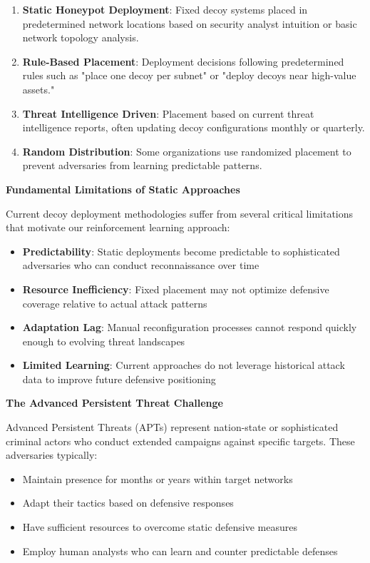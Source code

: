 \documentclass[12pt,oneside]{article}
\begin{document}
\begin{enumerate}
    \item \textbf{Static Honeypot Deployment}: Fixed decoy systems placed in predetermined network locations based on security analyst intuition or basic network topology analysis.
    
    \item \textbf{Rule-Based Placement}: Deployment decisions following predetermined rules such as "place one decoy per subnet" or "deploy decoys near high-value assets."
    
    \item \textbf{Threat Intelligence Driven}: Placement based on current threat intelligence reports, often updating decoy configurations monthly or quarterly.
    
    \item \textbf{Random Distribution}: Some organizations use randomized placement to prevent adversaries from learning predictable patterns.
\end{enumerate}

\textbf{Fundamental Limitations of Static Approaches}

Current decoy deployment methodologies suffer from several critical limitations that motivate our reinforcement learning approach:

\begin{itemize}
    \item \textbf{Predictability}: Static deployments become predictable to sophisticated adversaries who can conduct reconnaissance over time
    \item \textbf{Resource Inefficiency}: Fixed placement may not optimize defensive coverage relative to actual attack patterns
    \item \textbf{Adaptation Lag}: Manual reconfiguration processes cannot respond quickly enough to evolving threat landscapes
    \item \textbf{Limited Learning}: Current approaches do not leverage historical attack data to improve future defensive positioning
\end{itemize}

\textbf{The Advanced Persistent Threat Challenge}

Advanced Persistent Threats (APTs) represent nation-state or sophisticated criminal actors who conduct extended campaigns against specific targets. These adversaries typically:

\begin{itemize}
    \item Maintain presence for months or years within target networks
    \item Adapt their tactics based on defensive responses
    \item Have sufficient resources to overcome static defensive measures
    \item Employ human analysts who can learn and counter predictable defenses
\end{itemize}
\end{document}
